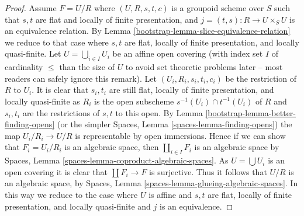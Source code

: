 \begin{proof}
\medskip\noindent
Assume $F = U/R$ where $(U, R, s, t, c)$ is a groupoid scheme
over $S$ such that $s, t$ are flat and locally of finite presentation, and
$j = (t, s) : R \to U \times_S U$ is an equivalence relation. By
Lemma \ref{bootstrap-lemma-slice-equivalence-relation}
we reduce to that case where $s, t$ are flat,
locally of finite presentation, and locally quasi-finite.
Let $U = \bigcup_{i \in I} U_i$ be an affine open covering
(with index set $I$ of cardinality $\leq$ than the size of $U$ to avoid
set theoretic problems later -- most readers can safely ignore this remark).
Let $(U_i, R_i, s_i, t_i, c_i)$ be the restriction of $R$
to $U_i$. It is clear that $s_i, t_i$ are still flat, locally of finite
presentation, and locally quasi-finite as $R_i$ is the open subscheme
$s^{-1}(U_i) \cap t^{-1}(U_i)$ of $R$
and $s_i, t_i$ are the restrictions of $s, t$ to this open. By
Lemma \ref{bootstrap-lemma-better-finding-opens}
(or the simpler
Spaces, Lemma \ref{spaces-lemma-finding-opens})
the map $U_i/R_i \to U/R$ is representable by open immersions.
Hence if we can show that $F_i = U_i/R_i$ is an algebraic space, then
$\coprod_{i \in I} F_i$ is an algebraic space by
Spaces, Lemma \ref{spaces-lemma-coproduct-algebraic-spaces}.
As $U = \bigcup U_i$ is an open covering it is clear that
$\coprod F_i \to F$ is surjective. Thus
it follows that $U/R$ is an algebraic space, by
Spaces, Lemma \ref{spaces-lemma-glueing-algebraic-spaces}.
In this way we reduce to the case where $U$ is affine and $s, t$ are flat,
locally of finite presentation, and locally quasi-finite and
$j$ is an equivalence.


\end{proof}
